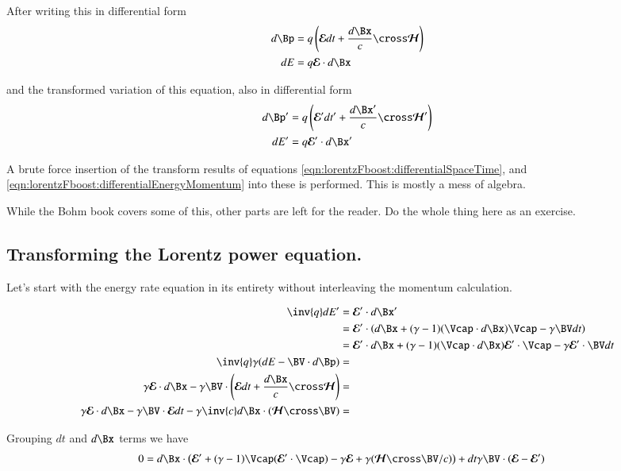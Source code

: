 After writing this
in differential form
\begin{align}\label{eqn:lorentzFboost:untransformedLorentzForce}
d\Bp &= q \left( \EE dt + \frac{d\Bx}{c} \cross \HH \right) \\
dE &= q \EE \cdot d\Bx
\end{align}

and the transformed variation of this equation, also in differential form
\begin{align}\label{eqn:lorentzFboost:transformedLorentzForce}
d\Bp' &= q \left( \EE' dt' + \frac{d\Bx'}{c} \cross \HH' \right) \\
dE' &= q \EE' \cdot d\Bx'
\end{align}

A brute force insertion of the transform results of equations
\ref{eqn:lorentzFboost:differentialSpaceTime}, and \ref{eqn:lorentzFboost:differentialEnergyMomentum} into these is performed.  This is mostly
a mess of algebra.  

While the Bohm book covers some of this, other parts are left for the reader.  Do the whole thing here as an exercise.

\subsection{Transforming the Lorentz power equation. }

Let's start with the energy rate equation in its entirety without interleaving the momentum calculation.

\begin{align*}
\inv{q} dE' 
&= \EE' \cdot d\Bx' \\
&= \EE' \cdot \left( d\Bx + (\gamma-1)(\Vcap \cdot d\Bx) \Vcap - \gamma \BV dt \right) \\
&= \EE' \cdot d\Bx + (\gamma-1)(\Vcap \cdot d\Bx) \EE' \cdot \Vcap - \gamma \EE' \cdot \BV dt \\
\inv{q}\gamma ( dE - \BV \cdot d\Bp ) &= \\
\gamma \EE \cdot d\Bx - \gamma \BV \cdot \left(\EE dt + \frac{d\Bx}{c} \cross \HH \right) &= \\
\gamma \EE \cdot d\Bx 
- \gamma \BV \cdot \EE dt 
- \gamma \inv{c} d\Bx \cdot (\HH \cross \BV) &= \\
\end{align*}

Grouping $dt$ and $d\Bx$ terms we have
\begin{align*}
0 &= 
d\Bx \cdot \left(
\EE' + (\gamma-1) \Vcap (\EE' \cdot \Vcap)
-\gamma \EE 
+ \gamma (\HH \cross \BV/c) 
\right)
+ dt \gamma \BV \cdot (\EE - \EE')
\end{align*}

